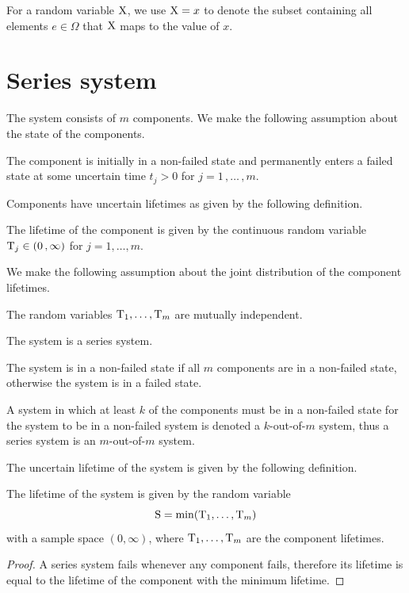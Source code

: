\documentclass[
    11pt,
    extrafontsizes,
    article,
    oldfontcommands,
    final,
    oneside,
    openany,
    hidelinks]{memoir}
\begin{document}
For a random variable $\mathrm{X}$, we use $\mathrm{X} = x$ to denote the subset containing all elements $e \in \Omega$ that $\mathrm{X}$ maps to the value of $x$.

\section{Series system}
The system consists of $m$ components. We make the following assumption about 
the state of the components.
\begin{assumption}
\label{asm:binary_state}
The \jth component is initially in a non-failed state and permanently enters a failed state at some uncertain time $t_j > 0$ for $j=1\,,\ldots\,,m$.
\end{assumption}
Components have uncertain lifetimes as given by the following definition.
\begin{definition}
The lifetime of the \jth component is given by the continuous random variable 
$\mathrm{T}_j \in \left(0\,,\infty\right)$ for $j=1,\ldots,m$.
\end{definition}
We make the following assumption about the joint distribution of the component lifetimes.
\begin{assumption}
\label{asm:indep}
The random variables $\mathrm{T}_1,\ldots,\mathrm{T}_m$ are mutually independent.
\end{assumption}

The system is a series system.
\begin{assumption}
    The system is in a non-failed state if all $m$ components are in a non-failed state, otherwise the system is in a failed state.
\end{assumption}
A system in which at least $k$ of the components must be in a non-failed state for the system to be in a non-failed system is denoted a $k$-out-of-$m$ system, 
thus a series system is an $m$-out-of-$m$ system.

The uncertain lifetime of the system is given by the following definition.
\begin{theorem}
    \label{thm:series_system_lifetime}
    The lifetime of the system is given by the random variable
    \begin{equation}
    \label{eq:series_system_lifetime}
    \mathrm{S} = \min{\!\left(\mathrm{T}_1,\ldots,\mathrm{T}_m\right)}
    \end{equation}
    with a sample space $\left(0, \infty\right)$, where $\mathrm{T}_1,\ldots,\mathrm{T}_m$ are the component lifetimes.
\end{theorem}
\begin{proof}
    A series system fails whenever any component fails, therefore its lifetime is equal to the lifetime of the component with the minimum lifetime.
\end{proof}
\end{document}
